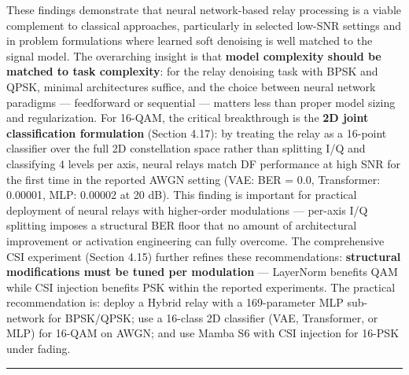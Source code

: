These findings demonstrate that neural network-based relay processing is a viable complement to classical approaches, particularly in selected low-SNR settings and in problem formulations where learned soft denoising is well matched to the signal model. The overarching insight is that \textbf{model complexity should be matched to task complexity}: for the relay denoising task with BPSK and QPSK, minimal architectures suffice, and the choice between neural network paradigms --- feedforward or sequential --- matters less than proper model sizing and regularization. For 16-QAM, the critical breakthrough is the \textbf{2D joint classification formulation} (Section 4.17): by treating the relay as a 16-point classifier over the full 2D constellation space rather than splitting I/Q and classifying 4 levels per axis, neural relays match DF performance at high SNR for the first time in the reported AWGN setting (VAE: BER = 0.0, Transformer: 0.00001, MLP: 0.00002 at 20 dB). This finding is important for practical deployment of neural relays with higher-order modulations --- per-axis I/Q splitting imposes a structural BER floor that no amount of architectural improvement or activation engineering can fully overcome. The comprehensive CSI experiment (Section 4.15) further refines these recommendations: \textbf{structural modifications must be tuned per modulation} --- LayerNorm benefits QAM while CSI injection benefits PSK within the reported experiments. The practical recommendation is: deploy a Hybrid relay with a 169-parameter MLP sub-network for BPSK/QPSK; use a 16-class 2D classifier (VAE, Transformer, or MLP) for 16-QAM on AWGN; and use Mamba S6 with CSI injection for 16-PSK under fading.

\begin{center}\rule{0.5\linewidth}{0.5pt}\end{center}

